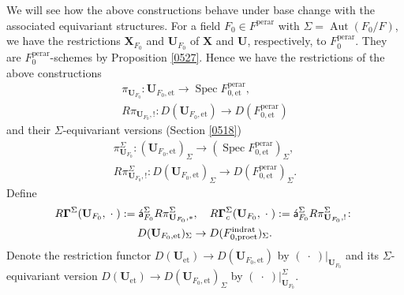 \documentclass{amsart}
\theoremstyle{remark}
\numberwithin{equation}{subsection}
\newcommand{\et}{\mathrm{et}}
\newcommand{\rat}{\mathrm{rat}}
\newcommand{\ind}{\mathrm{ind}}
\newcommand{\pro}{\mathrm{pro}}
\newcommand{\perar}{\mathrm{perar}}
\newcommand{\alg}[1]{\mathbf{#1}}
\newcommand{\var}{\;\cdot\;}
\newcommand{\algebrize}{\Acute{\mathsf{a}}}
\DeclareMathOperator{\Aut}{Aut}
\DeclareMathOperator{\Spec}{Spec}
\begin{document}
We will see how the above constructions behave under base change
with the associated equivariant structures.
For a field $F_{0} \in F^{\perar}$ with $\Sigma = \Aut(F_{0} / F)$,
we have the restrictions $\alg{X}_{F_{0}}$ and $\alg{U}_{F_{0}}$
of $\alg{X}$ and $\alg{U}$, respectively, to $F_{0}^{\perar}$.
They are $F_{0}^{\perar}$-schemes by Proposition \ref{0527}.
Hence we have the restrictions of the above constructions
	\begin{gather*}
				\pi_{\alg{U}_{F_{0}}}
			\colon
				\alg{U}_{F_{0}, \et}
			\to
				\Spec F^{\perar}_{0, \et},
		\\
				R \pi_{\alg{U}_{F_{0}}, !}
			\colon
				D(\alg{U}_{F_{0}, \et})
			\to
				D(F^{\perar}_{0, \et})
	\end{gather*}
and their $\Sigma$-equivariant versions (Section \ref{0518})
	\begin{gather*}
				\pi_{\alg{U}_{F_{0}}}^{\Sigma}
			\colon
				(\alg{U}_{F_{0}, \et})_{\Sigma}
			\to
				(\Spec F^{\perar}_{0, \et})_{\Sigma},
		\\
				R \pi_{\alg{U}_{F_{0}}, !}^{\Sigma}
			\colon
				D(\alg{U}_{F_{0}, \et})_{\Sigma}
			\to
				D(F^{\perar}_{0, \et})_{\Sigma}.
	\end{gather*}
Define
	\begin{gather*}
				R \alg{\Gamma}^{\Sigma}(\alg{U}_{F_{0}}, \var)
			:=
				\algebrize_{F_{0}}^{\Sigma}
				R \pi_{\alg{U}_{F_{0}}, \ast}^{\Sigma},
			\quad
				R \alg{\Gamma}_{c}^{\Sigma}(\alg{U}_{F_{0}}, \var)
			:=
				\algebrize_{F_{0}}^{\Sigma}
				R \pi_{\alg{U}_{F_{0}}, !}^{\Sigma}
			\colon
		\\
				D(\alg{U}_{F_{0}, \et})_{\Sigma}
			\to
				D(F^{\ind\rat}_{0, \pro\et})_{\Sigma}.
	\end{gather*}
Denote the restriction functor
$D(\alg{U}_{\et}) \to D(\alg{U}_{F_{0}, \et})$ by $(\var)|_{\alg{U}_{F_{0}}}$
and its $\Sigma$-equivariant version
$D(\alg{U}_{\et}) \to D(\alg{U}_{F_{0}, \et})_{\Sigma}$ by $(\var)|_{\alg{U}_{F_{0}}}^{\Sigma}$.
\end{document}
